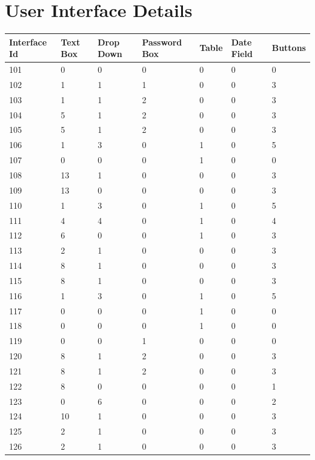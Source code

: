 \documentclass[12pt,a4paper]{report}
\begin{document}
\chapter {User Interface Details }
\begin{center}
\begin{tabular}{ | m{1.5cm} | m{1.5cm}| | m{1.5cm}|| m{1.5cm}| | m{1cm} | m{1.5cm}| | m{1.5cm}|} 
 \hline
\textbf{ Interface Id} & \textbf{Text Box} & \textbf{Drop Down} & \textbf{Password Box} & \textbf{Table} & \textbf{Date Field} &\textbf{Buttons} \\  \hline
  101 &0 & 0 & 0 & 0 & 0 & 0 \\ \hline
  102 &1 & 1 & 1 & 0 & 0 & 3 \\ \hline
  103 &1 & 1 & 2 & 0 & 0 & 3 \\ \hline
  104 &5 & 1 & 2 & 0 & 0 & 3 \\ \hline
  105 &5 & 1 & 2 & 0 & 0 & 3 \\ \hline
  106 &1 & 3 & 0 & 1 & 0 & 5 \\ \hline
  107 &0 & 0 & 0 & 1 & 0 & 0 \\ \hline  
  108 &13 &1 & 0 & 0 & 0 & 3 \\ \hline  
  109 &13 &0 & 0 & 0 & 0 & 3 \\ \hline  
  110 &1 & 3 & 0 & 1 & 0 & 5 \\ \hline  
  111 &4 & 4 & 0 & 1 & 0 & 4 \\ \hline
  112 &6 & 0 & 0 & 1 & 0 & 3 \\ \hline  
  113 &2 & 1 & 0 & 0 & 0 & 3 \\ \hline
  114 &8 & 1 & 0 & 0 & 0 & 3 \\ \hline
  115 &8 & 1 & 0 & 0 & 0 & 3 \\ \hline
  116 &1 & 3 & 0 & 1 & 0 & 5 \\ \hline
  117 &0 & 0 & 0 & 1 & 0 & 0 \\ \hline
  118 &0 & 0 & 0 & 1 & 0 & 0 \\ \hline
  119 &0 & 0 & 1 & 0 & 0 & 0 \\ \hline
  120 &8 & 1 & 2 & 0 & 0 & 3 \\ \hline
  121 &8 & 1 & 2 & 0 & 0 & 3 \\ \hline
  122 &8 & 0 & 0 & 0 & 0 & 1 \\ \hline
  123 &0 & 6 & 0 & 0 & 0 & 2 \\ \hline
  124 &10& 1 & 0 & 0 & 0 & 3 \\ \hline
  125 &2 & 1 & 0 & 0 & 0 & 3 \\ \hline
  126 &2 & 1 & 0 & 0 & 0 & 3 \\ \hline
\end{tabular}
\end{center}
\end{document}
